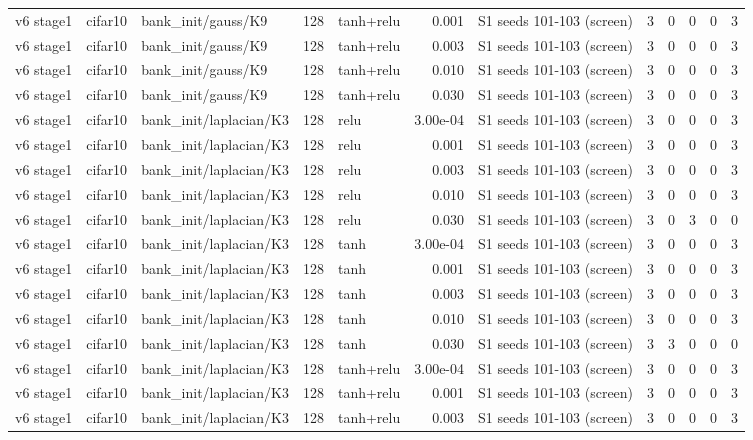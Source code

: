 \begin{table}[htbp]
{\begin{tabular}{@{}lllrlrlrrrrr@{}}
v6 stage1 & cifar10 & bank\_init/gauss/K9 & 128 & tanh+relu & 0.001 & S1 seeds 101-103 (screen) & 3 & 0 & 0 & 0 & 3 \\
v6 stage1 & cifar10 & bank\_init/gauss/K9 & 128 & tanh+relu & 0.003 & S1 seeds 101-103 (screen) & 3 & 0 & 0 & 0 & 3 \\
v6 stage1 & cifar10 & bank\_init/gauss/K9 & 128 & tanh+relu & 0.010 & S1 seeds 101-103 (screen) & 3 & 0 & 0 & 0 & 3 \\
v6 stage1 & cifar10 & bank\_init/gauss/K9 & 128 & tanh+relu & 0.030 & S1 seeds 101-103 (screen) & 3 & 0 & 0 & 0 & 3 \\
v6 stage1 & cifar10 & bank\_init/laplacian/K3 & 128 & relu & 3.00e-04 & S1 seeds 101-103 (screen) & 3 & 0 & 0 & 0 & 3 \\
v6 stage1 & cifar10 & bank\_init/laplacian/K3 & 128 & relu & 0.001 & S1 seeds 101-103 (screen) & 3 & 0 & 0 & 0 & 3 \\
v6 stage1 & cifar10 & bank\_init/laplacian/K3 & 128 & relu & 0.003 & S1 seeds 101-103 (screen) & 3 & 0 & 0 & 0 & 3 \\
v6 stage1 & cifar10 & bank\_init/laplacian/K3 & 128 & relu & 0.010 & S1 seeds 101-103 (screen) & 3 & 0 & 0 & 0 & 3 \\
v6 stage1 & cifar10 & bank\_init/laplacian/K3 & 128 & relu & 0.030 & S1 seeds 101-103 (screen) & 3 & 0 & 3 & 0 & 0 \\
v6 stage1 & cifar10 & bank\_init/laplacian/K3 & 128 & tanh & 3.00e-04 & S1 seeds 101-103 (screen) & 3 & 0 & 0 & 0 & 3 \\
v6 stage1 & cifar10 & bank\_init/laplacian/K3 & 128 & tanh & 0.001 & S1 seeds 101-103 (screen) & 3 & 0 & 0 & 0 & 3 \\
v6 stage1 & cifar10 & bank\_init/laplacian/K3 & 128 & tanh & 0.003 & S1 seeds 101-103 (screen) & 3 & 0 & 0 & 0 & 3 \\
v6 stage1 & cifar10 & bank\_init/laplacian/K3 & 128 & tanh & 0.010 & S1 seeds 101-103 (screen) & 3 & 0 & 0 & 0 & 3 \\
v6 stage1 & cifar10 & bank\_init/laplacian/K3 & 128 & tanh & 0.030 & S1 seeds 101-103 (screen) & 3 & 3 & 0 & 0 & 0 \\
v6 stage1 & cifar10 & bank\_init/laplacian/K3 & 128 & tanh+relu & 3.00e-04 & S1 seeds 101-103 (screen) & 3 & 0 & 0 & 0 & 3 \\
v6 stage1 & cifar10 & bank\_init/laplacian/K3 & 128 & tanh+relu & 0.001 & S1 seeds 101-103 (screen) & 3 & 0 & 0 & 0 & 3 \\
v6 stage1 & cifar10 & bank\_init/laplacian/K3 & 128 & tanh+relu & 0.003 & S1 seeds 101-103 (screen) & 3 & 0 & 0 & 0 & 3 \\

\end{tabular}}
\end{table}
